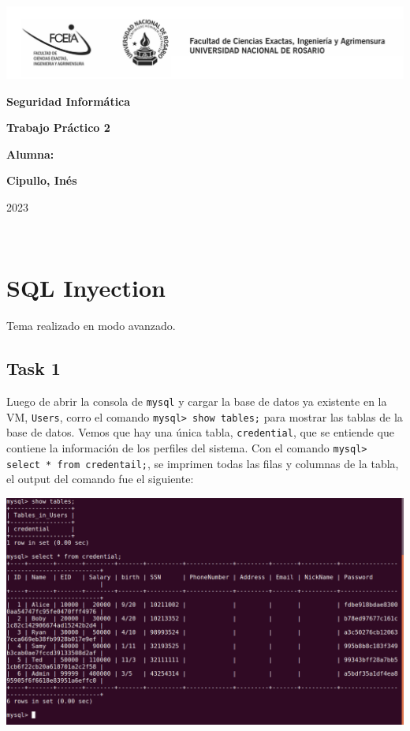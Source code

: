 \documentclass[11pt]{article}
\begin{document}
\begin{titlepage}
    \hspace{-2.5cm}\includegraphics[scale= 0.48]{../header.png}
    \begin{center}
        \vfill
            \noindent\textbf{\Huge Seguridad Informática}\par
            \vspace{.5cm}
            \noindent\textbf{\Huge Trabajo Práctico 2}\par
            \vspace{.5cm}
        \vfill
        \noindent \textbf{\huge Alumna:}\par
        \vspace{.5cm}
        \noindent \textbf{\Large Cipullo, Inés}\par
 
        \vfill
        \noindent\large 2023
    \end{center}
\end{titlepage}
\ \par

\section*{SQL Inyection}
Tema realizado en modo avanzado.

\subsection*{Task 1}
Luego de abrir la consola de \verb|mysql| y cargar la base de datos ya existente en la VM, \verb|Users|, 
corro el comando \verb|mysql> show tables;| para mostrar las tablas de la base de datos. Vemos que hay 
una única tabla, \verb|credential|, que se entiende que contiene la información de los perfiles del sistema.
Con el comando \verb|mysql> select * from credentail;|, se imprimen todas las filas y columnas de la tabla,
el output del comando fue el siguiente:

\begin{center}
\includegraphics[scale=.34]{task1_sql.png}
\end{center}
\end{document}
